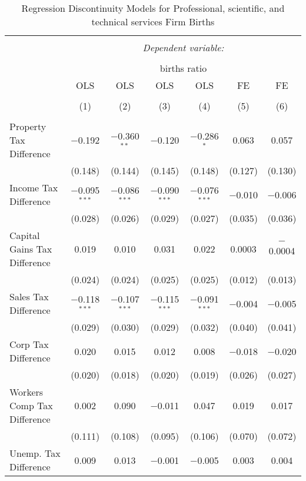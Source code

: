 
\begin{table}[!htbp] \centering 
  \caption{Regression Discontinuity Models for  Professional, scientific, and technical services Firm Births} 
  \label{54rd} 
\begin{tabular}{@{\extracolsep{5pt}}lcccccc} 
\\[-1.8ex]\hline 
\hline \\[-1.8ex] 
 & \multicolumn{6}{c}{\textit{Dependent variable:}} \\ 
\cline{2-7} 
\\[-1.8ex] & \multicolumn{6}{c}{births ratio} \\ 
 & OLS & OLS & OLS & OLS & FE & FE \\ 
\\[-1.8ex] & (1) & (2) & (3) & (4) & (5) & (6)\\ 
\hline \\[-1.8ex] 
 Property Tax Difference & $-$0.192 & $-$0.360$^{**}$ & $-$0.120 & $-$0.286$^{*}$ & 0.063 & 0.057 \\ 
  & (0.148) & (0.144) & (0.145) & (0.148) & (0.127) & (0.130) \\ 
  Income Tax Difference & $-$0.095$^{***}$ & $-$0.086$^{***}$ & $-$0.090$^{***}$ & $-$0.076$^{***}$ & $-$0.010 & $-$0.006 \\ 
  & (0.028) & (0.026) & (0.029) & (0.027) & (0.035) & (0.036) \\ 
  Capital Gains Tax Difference & 0.019 & 0.010 & 0.031 & 0.022 & 0.0003 & $-$0.0004 \\ 
  & (0.024) & (0.024) & (0.025) & (0.025) & (0.012) & (0.013) \\ 
  Sales Tax Difference & $-$0.118$^{***}$ & $-$0.107$^{***}$ & $-$0.115$^{***}$ & $-$0.091$^{***}$ & $-$0.004 & $-$0.005 \\ 
  & (0.029) & (0.030) & (0.029) & (0.032) & (0.040) & (0.041) \\ 
  Corp Tax Difference & 0.020 & 0.015 & 0.012 & 0.008 & $-$0.018 & $-$0.020 \\ 
  & (0.020) & (0.018) & (0.020) & (0.019) & (0.026) & (0.027) \\ 
  Workers Comp Tax Difference & 0.002 & 0.090 & $-$0.011 & 0.047 & 0.019 & 0.017 \\ 
  & (0.111) & (0.108) & (0.095) & (0.106) & (0.070) & (0.072) \\ 
  Unemp. Tax Difference & 0.009 & 0.013 & $-$0.001 & $-$0.005 & 0.003 & 0.004 \\ 

\end{tabular}
\end{table}
